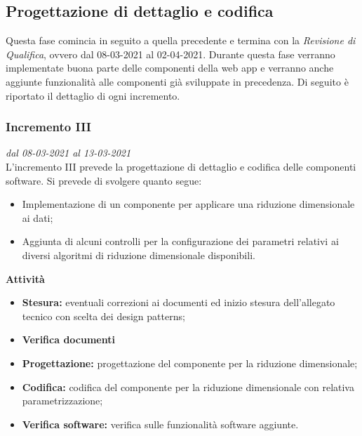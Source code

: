 \subsection{Progettazione di dettaglio e codifica}
Questa fase comincia in seguito a quella precedente e termina con la \textit{Revisione di Qualifica}, ovvero dal 08-03-2021 al 02-04-2021. Durante questa fase verranno implementate buona parte delle componenti della web app e verranno anche aggiunte funzionalità alle componenti già sviluppate in precedenza.
Di seguito è riportato il dettaglio di ogni incremento.

\subsubsection{Incremento III}
\textit{dal 08-03-2021 al 13-03-2021}\\
L'incremento III prevede la progettazione di dettaglio e codifica delle componenti software. Si prevede di svolgere quanto segue:
\begin{itemize}
\item Implementazione di un componente per applicare una riduzione dimensionale ai dati;
\item Aggiunta di alcuni controlli per la configurazione dei parametri relativi ai diversi algoritmi di riduzione dimensionale disponibili.
\end{itemize}
\textbf{Attività}
\begin{itemize}
\item \textbf{Stesura:} eventuali correzioni ai documenti ed inizio stesura dell'allegato tecnico con scelta dei design patterns;
\item \textbf{Verifica documenti}
\item \textbf{Progettazione:} progettazione del componente per la riduzione dimensionale;
\item \textbf{Codifica:} codifica del componente per la riduzione dimensionale con relativa parametrizzazione;
\item \textbf{Verifica software:} verifica sulle funzionalità software aggiunte.
\end{itemize}
